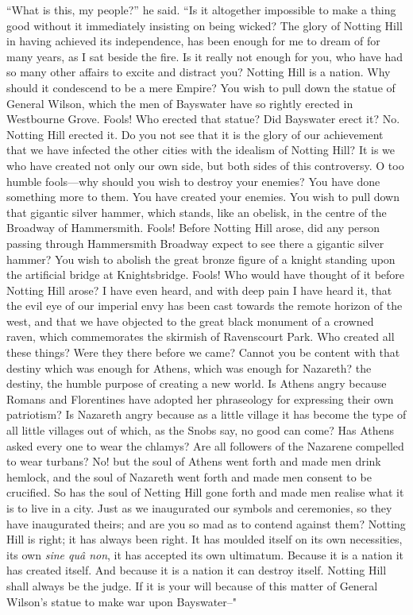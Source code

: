 \documentclass{book}
\begin{document}
“What is this, my people?” he said. “Is it altogether impossible to make a thing good without it immediately insisting on being wicked? The glory of Notting Hill in having achieved its independence, has been enough for me to dream of for many years, as I sat beside the fire. Is it really not enough for you, who have had so many other affairs to excite and distract you? Notting Hill is a nation. Why should it condescend to be a mere Empire? You wish to pull down the statue of General Wilson, which the men of Bayswater have so rightly erected in Westbourne Grove. Fools! Who erected that statue? Did Bayswater erect it? No. Notting Hill erected it. Do you not see that it is the glory of our achievement that we have infected the other cities with the idealism of Notting Hill? It is we who have created not only our own side, but both sides of this controversy. O too humble fools—why should you wish to destroy your enemies? You have done something more to them. You have created your enemies. You wish to pull down that gigantic silver hammer, which stands, like an obelisk, in the centre of the Broadway of Hammersmith. Fools! Before Notting Hill arose, did any person passing through Hammersmith Broadway expect to see there a gigantic silver hammer? You wish to abolish the great bronze figure of a knight standing upon the artificial bridge at Knightsbridge. Fools! Who would have thought of it before Notting Hill arose? I have even heard, and with deep pain I have heard it, that the evil eye of our imperial envy has been cast towards the remote horizon of the west, and that we have objected to the great black monument of a crowned raven, which commemorates the skirmish of Ravenscourt Park. Who created all these things? Were they there before we came? Cannot you be content with that destiny which was enough for Athens, which was enough for Nazareth? the destiny, the humble purpose of creating a new world. Is Athens angry because Romans and Florentines have adopted her phraseology for expressing their own patriotism? Is Nazareth angry because as a little village it has become the type of all little villages out of which, as the Snobs say, no good can come? Has Athens asked every one to wear the chlamys? Are all followers of the Nazarene compelled to wear turbans? No! but the soul of Athens went forth and made men drink hemlock, and the soul of Nazareth went forth and made men consent to be crucified. So has the soul of Netting Hill gone forth and made men realise what it is to live in a city. Just as we inaugurated our symbols and ceremonies, so they have inaugurated theirs; and are you so mad as to contend against them? Notting Hill is right; it has always been right. It has moulded itself on its own necessities, its own \emph{sine quâ non}, it has accepted its own ultimatum. Because it is a nation it has created itself. And because it is a nation it can destroy itself. Notting Hill shall always be the judge. If it is your will because of this matter of General Wilson’s statue to make war upon Bayswater–"
\end{document}
